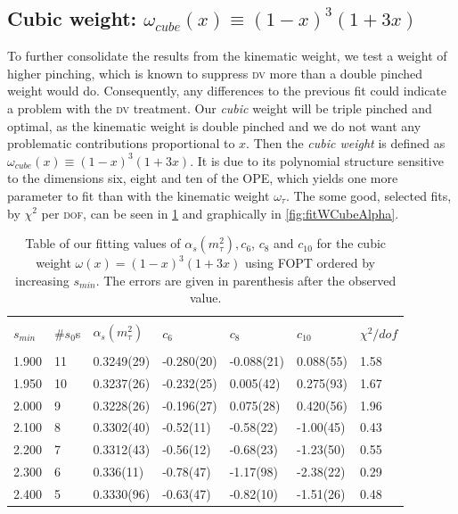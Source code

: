 \documentclass[../../index.tex]{subfiles}
\begin{document}
\subsection{Cubic weight: $\omega_{cube}(x) \equiv (1-x)^3(1+3x)$}
To further consolidate the results from the kinematic weight, we test
a weight of higher pinching, which is known to suppress \textsc{dv} more than a
double pinched weight would do. Consequently, any differences to the previous
fit could indicate a problem with the \textsc{dv} treatment. Our \textit{cubic}
weight will be triple pinched and optimal, as the kinematic weight is double
pinched and we do not want any problematic contributions proportional to $x$.
Then the \textit{cubic weight} is defined as $\omega_{cube}(x) \equiv
(1-x)^3(1+3x)$. It is due to its polynomial structure sensitive to the dimensions
six, eight and ten of the \textsc{OPE}, which yields one more parameter to fit
than with the kinematic weight $\omega_\tau$. The some good, selected fits, by
$\chi^2$ per \textsc{dof}, can be seen in \cref{table:fitWCubicAlD6D8D10} and
graphically in \cref{fig:fitWCubeAlpha}.
\begin{table}
  \centering
  \begin{tabular}{lllllll}
    \toprule \\
    $s_{min}$ & \#$s_0$s & $\alpha_s(m_\tau^2)$ & $c_6$ & $c_8$ & $c_{10}$ & $\chi^2/dof$  \\
    \hline \\
    1.900 & 11 & 0.3249(29) & -0.280(20) & -0.088(21) & 0.088(55) & 1.58 \\
    1.950 & 10 & 0.3237(26) & -0.232(25) & 0.005(42) & 0.275(93) & 1.67 \\
    2.000 & 9 & 0.3228(26) & -0.196(27) & 0.075(28) & 0.420(56) & 1.96 \\
    \rowcolor{primary}
    2.100 & 8 & 0.3302(40) & -0.52(11) & -0.58(22) & -1.00(45) & 0.43 \\
    \rowcolor{primary}
    2.200 & 7 & 0.3312(43) & -0.56(12) & -0.68(23) & -1.23(50) & 0.55 \\
    \rowcolor{primary}
    2.300 & 6 & 0.336(11) & -0.78(47) & -1.17(98) & -2.38(22) & 0.29 \\
    \rowcolor{primary}
    2.400 & 5 & 0.3330(96) & -0.63(47) & -0.82(10) & -1.51(26) & 0.48 \\
    \bottomrule
  \end{tabular}
  \caption{Table of our fitting values of $\alpha_s(m_\tau^2), c_6$, $c_8$ and
    $c_{10}$ for the cubic weight $\omega(x)=(1-x)^3(1+3x)$ using FOPT ordered
    by increasing $s_{min}$. The errors are given in parenthesis after the observed value.}
  \label{table:fitWCubicAlD6D8D10}
\end{table}
\end{document}
